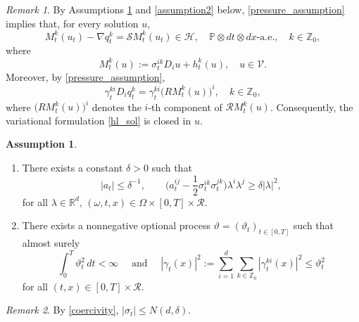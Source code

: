 \documentclass[11pt,reqno]{amsart}
\theoremstyle{definition}
\newtheorem{assumption}{Assumption}[section]
\theoremstyle{remark}
\newtheorem{remark}{Remark}[section]
\newcommand\bZ{\mathbb{Z}}
\newcommand\cR{\mathcal{R}}
\newcommand{\<}{\langle}
\renewcommand{\>}{\rangle}
\begin{document}
\begin{remark}
By Assumptions \ref{assumption1} and  \ref{assumption2} below,  
\eqref{pressure_assumption} implies that, for every solution $u$,
$$
M_t^k(u_t)-\nabla q_t^k=\mathcal S M_t^k(u_t)\in \mathcal H,
\quad
\mathbb P\otimes dt\otimes dx\text{-a.e.},
\quad k\in\bZ_0,
$$
where
\begin{equation}
                           \label{stochastic_integrand}
M_t^k(u):=\sigma_t^{ik}D_i u+h_t^k(u),
\quad
u\in\mathcal V.
\end{equation}
Moreover, by \eqref{pressure_assumption},
\begin{equation}
                         \label{closure_assumption}
\gamma_t^{ki}D_i q_t^k
=\gamma_t^{ki}\big(R M_t^k(u)\big)^i,
\quad k\in\bZ_0,
\end{equation}
where
$\big(R M_t^k(u)\big)^i$
denotes the $i$-th component of $\mathcal R M_t^k(u)$. 
Consequently, the variational formulation \eqref{hl_sol} is closed in $u$.
\end{remark}


\begin{assumption}
                                                            \label{assumption1}
\begin{enumerate}
\item[(i)] There exists a constant $\delta>0$ such that
\begin{equation}
\label{coercivity}
|a_t|
\le
\delta^{-1},
\qquad
\Big(
a_t^{ij}
-
\frac12\sigma_t^{ik}\sigma_t^{jk}
\Big)\lambda^i\lambda^j
\ge
\delta|\lambda|^2,
\end{equation}
for all
$
\lambda\in\mathbb R^d,
\, (\omega,t,x)\in\Omega\times[0,T]\times\cR.
$

\item[(ii)]
There exists a nonnegative optional process
$
\vartheta=(\vartheta_t)_{t\in[0,T]}
$
such that almost surely
\begin{equation}
                                                    \label{g_uperbound}
\int_0^T \vartheta_t^2\,dt<\infty\quad \text{ and } \quad |\gamma_t(x)|^2
:=
\sum_{i=1}^d\sum_{k\in\bZ_0}
|\gamma_t^{ki}(x)|^2
\leq \vartheta_t^2 
\end{equation}
 for all
$
(t,x)\in[0,T]\times\cR.
$
\end{enumerate}
\end{assumption}

\begin{remark}
                                           \label{remark sigma}
By \eqref{coercivity},
$|\sigma_t|\leq N(d,\delta)$. 
\end{remark}
\end{document}

